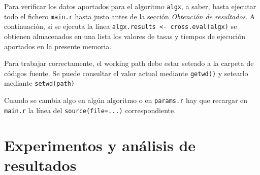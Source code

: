 \documentclass[a4paper,11pt]{article}
\begin{document}
 Para verificar los datos aportados para el algoritmo \texttt{algx}, a saber, basta ejecutar todo el fichero \texttt{main.r}
 hasta justo antes de la sección \textit{Obtención de resultados}. A continuación, si se ejecuta la línea 
 \texttt{algx.results <- cross.eval(algx)} se obtienen almacenados en una lista los valores de tasas y tiempos de ejecución
 aportados en la presente memoria. 
 
 Para trabajar correctamente, el working path debe estar seteado a la carpeta de códigos fuente. Se puede consultar el 
 valor actual mediante \texttt{getwd()} y setearlo mediante \texttt{setwd(path)}
 
 Cuando se cambia algo en algún algoritmo o en \texttt{params.r} hay que recargar en \texttt{main.r}
 la línea del \texttt{source(file=...)} correspondiente.
 
 \section{Experimentos y análisis de resultados}
\end{document}
